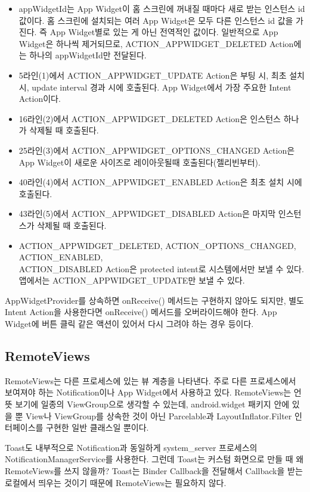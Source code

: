 \begin{itemize}
\item appWidgetId는 App Widget이 홈 스크린에 꺼내질 때마다 새로 받는 인스턴스 id 값이다. 홈 스크린에 설치되는 여러 App Widget은 모두 다른 인스턴스 id 값을 가진다. 즉 App Widget별로 있는 게 아닌 전역적인 값이다.
일반적으로 App Widget은 하나씩 제거되므로, ACTION\_APPWIDGET\_DELETED Action에는 하나의 appWidgetId만 전달된다.
\item 5라인(1)에서 ACTION\_APPWIDGET\_UPDATE Action은 부팅 시, 최초 설치 시, update interval 경과 시에 호출된다. App Widget에서 가장 주요한 Intent Action이다.
\item 16라인(2)에서 ACTION\_APPWIDGET\_DELETED Action은 인스턴스 하나가 삭제될 때 호출된다.
\item 25라인(3)에서 ACTION\_APPWIDGET\_OPTIONS\_CHANGED Action은 App Widget이 새로운 사이즈로 레이아웃될때 호출된다(젤리빈부터).
\item 40라인(4)에서 ACTION\_APPWIDGET\_ENABLED Action은 최초 설치 시에 호출된다.
\item 43라인(5)에서 ACTION\_APPWIDGET\_DISABLED Action은 마지막 인스턴스가 삭제될 때 호출된다.
\item ACTION\_APPWIDGET\_DELETED, ACTION\_OPTIONS\_CHANGED, ACTION\_ENABLED,\\
ACTION\_DISABLED Action은 protected intent로 시스템에서만 보낼 수 있다.
앱에서는 ACTION\_A\-PP\-WIDGET\_UPDATE만 보낼 수 있다.
\end{itemize}

AppWidgetProvider를 상속하면 onReceive() 메서드는 구현하지 않아도 되지만, 별도 Intent Action을 사용한다면 onReceive() 메서드를 오버라이드해야 한다. App Widget에 버튼 클릭 같은 액션이 있어서 다시 그려야 하는 경우 등이다.\\

\subsection{RemoteViews}
RemoteViews는 다른 프로세스에 있는 뷰 계층을 나타낸다. 주로 다른 프로세스에서 보여져야 하는 Notification이나 App Widget에서 사용하고 있다.
RemoteViews는 언뜻 보기에 일종의 ViewGroup으로 생각할 수 있는데, android.widget 패키지 안에 있을 뿐 View나 ViewGroup를 상속한 것이 아닌 Parcelable과 LayoutInflator.Filter 인터페이스를 구현한 일반 클래스일 뿐이다.\\

\colorbox{tearose}{\parbox[t]{15cm}{
Toast도 내부적으로 Notification과 동일하게 system\_server 프로세스의 NotificationManagerService를 사용한다. 그런데 Toast는 커스텀 화면으로 만들 때 왜 RemoteViews를 쓰지 않을까? Toast는 Binder Callback을 전달해서 Callback을 받는 로컬에서 띄우는 것이기 때문에 RemoteViews는 필요하지 않다.
}}\newline\newline

